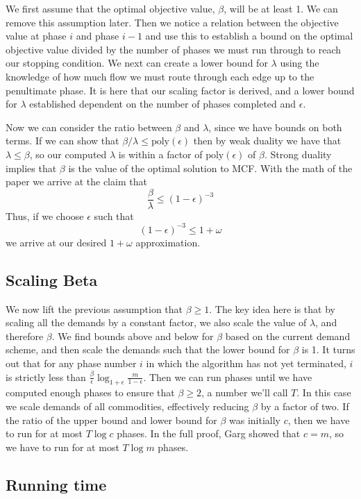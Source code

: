 We first assume that the
optimal objective value, $\beta$, will be at least 1. We can remove this
assumption later. Then we notice a relation between the objective
value at phase $i$ and phase $i-1$ and use this to establish a bound
on the optimal objective value divided by the number of phases we must
run through to reach our stopping condition. We next can create a
lower bound for $\lambda$ using the knowledge of how much flow we must
route through each edge up to the penultimate phase. It is here that
our scaling factor is derived, and a lower bound for $\lambda$
established dependent on the number of phases completed and
$\epsilon$. 

Now we can consider the ratio between $\beta$ and $\lambda$, since we have bounds on both terms. If we can show that
$\beta/\lambda\leq \text{poly}(\epsilon)$ then by weak duality we have
that $\lambda \leq \beta$, so our computed $\lambda$ is within a
factor of $\text{poly}(\epsilon)$ of $\beta$. Strong duality implies
that $\beta$ is the value of the optimal solution to MCF. With the
math of the paper  we arrive at the claim that 
$$\frac{\beta}{\lambda}\leq (1-\epsilon)^{-3}$$
Thus, if we choose $\epsilon$ such that 
$$(1-\epsilon)^{-3}\leq 1+\omega$$ 
we arrive at our desired $1+\omega$ approximation.
\subsection{Scaling Beta}
We now lift the previous assumption that $\beta\geq 1$. The key idea
here is that by scaling all the demands by a constant factor, we also
scale the value of $\lambda$, and therefore $\beta$. We
find bounds above and below for $\beta$ based on the current demand
scheme, and then scale the demands such that the lower bound for
$\beta$ is 1. It turns out that for any phase number $i$ in which the
algorithm has not yet terminated, $i$ is strictly less than
$\frac{\beta}{\epsilon}\log_{1+\epsilon}\frac{m}{1-\epsilon}$. Then we
can run phases until we have computed enough
phases to ensure that $\beta\geq 2$, a number we'll call $T$. In this case
we scale demands of
all commodities, effectively reducing $\beta$ by a factor of
two. If the ratio of the upper bound and lower bound for $\beta$ was
initially $c$, then we have to run for at most $T\log c$ phases. In
the full proof, Garg showed that $c=m$, so we have to run for at most
$T\log m$ phases.
\subsection{Running time}


